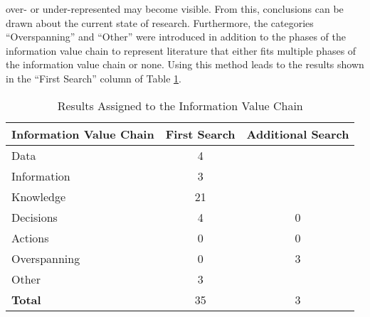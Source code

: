 over- or under-represented may become visible. From this, conclusions can be drawn about the current state of research. Furthermore, the categories \enquote{Overspanning} and \enquote{Other} were introduced in addition to the phases of the information value chain to represent literature that either fits multiple phases of the information value chain or none. Using this method leads to the results shown in the \enquote{First Search} column of Table \ref{informationValueChainResults}.


\begin{table}[htbp]
    \centering
    \small
    \begin{tabular}{lcc}
    \hline
    \multicolumn{1}{c}{Information Value Chain}  & First Search & \multicolumn{1}{l}{Additional Search} \\ \hline
    Data                                         & 4            &                                       \\
    Information                                  & 3            &                                       \\
    Knowledge                                    & 21           &                                       \\
    Decisions                                    & 4            & 0                                      \\
    Actions                                      & 0            & 0                                      \\
    Overspanning                                 & 0            & 3                                     \\
    Other                                        & 3            &                                       \\ \hline
    \textbf{Total}                               & 35           & 3                                     \\ \hline
    \end{tabular}
    \caption{Results Assigned to the Information Value Chain}
    \label{informationValueChainResults}
    \end{table}

